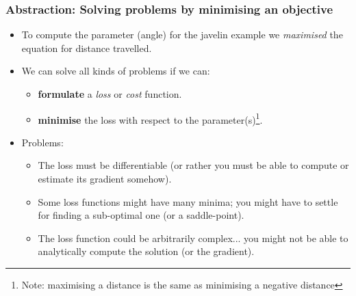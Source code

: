 \documentclass[\beamerclass]{beamer}
\begin{document}
\begin{frame}
\frametitle{Abstraction: Solving problems by minimising an objective}

\begin{itemize}
	\item<+-> To compute the parameter (angle) for the javelin example we \emph{maximised} the equation for distance travelled.
	\item<+-> We can solve all kinds of problems if we can:
	\begin{itemize}
	 	\item \textbf{formulate} a \emph{loss} or \emph{cost} function.
	 	\item<+-> \textbf{minimise} the loss with respect to the parameter(s)\footnote{Note: maximising a distance is the same as minimising a negative distance}.
	 \end{itemize} 
	 \item<+-> Problems:
	 \begin{itemize}
	 	\item The loss must be differentiable (or rather you must be able to compute or estimate its gradient somehow).
	 	\item Some loss functions might have many minima; you might have to settle for finding a sub-optimal one (or a saddle-point).
	 	\item The loss function could be arbitrarily complex... you might not be able to analytically compute the solution (or the gradient).
	 \end{itemize}
\end{itemize}

\end{frame}
\end{document}
